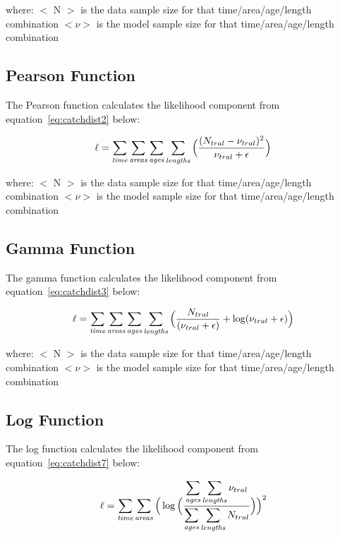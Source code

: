 \documentclass[10pt,twoside]{book}
\begin{document}
where:\newline
$<$ N $>$ is the data sample size for that time/area/age/length combination\newline
$<\nu>$ is the model sample size for that time/area/age/length combination

\subsection{Pearson Function}
The Pearson function calculates the likelihood component from equation~\ref{eq:catchdist2} below:

\begin{equation}\label{eq:catchdist2}
\ell = \sum_{\it time}\sum_{\it areas}\sum_{\it ages}\sum_{\it lengths} \Big( {\frac{ ( N_{tral} - \nu_{tral} ) ^2} {\nu_{tral} + \epsilon}} \Big)
\end{equation}

where:\newline
$<$ N $>$ is the data sample size for that time/area/age/length combination\newline
$<\nu>$ is the model sample size for that time/area/age/length combination

\subsection{Gamma Function}
The gamma function calculates the likelihood component from equation~\ref{eq:catchdist3} below:

\begin{equation}\label{eq:catchdist3}
\ell = \sum_{\it time}\sum_{\it areas}\sum_{\it ages}\sum_{\it lengths} \Big( {\frac{ N_{tral}} { (\nu_{tral} + \epsilon )} + \log ({\nu_{tral} + \epsilon}}) \Big)
\end{equation}

where:\newline
$<$ N $>$ is the data sample size for that time/area/age/length combination\newline
$<\nu>$ is the model sample size for that time/area/age/length combination

\subsection{Log Function}
The log function calculates the likelihood component from equation~\ref{eq:catchdist7} below:

\begin{equation}\label{eq:catchdist7}
\ell = \sum_{\it time}\sum_{\it areas} \Big( \log \Big( {\frac{ \displaystyle \sum_{\it ages}\sum_{\it lengths} \nu_{tral}} { \displaystyle \sum_{\it ages}\sum_{\it lengths} N_{tral}}} \Big) \Big) ^2
\end{equation}
\end{document}
